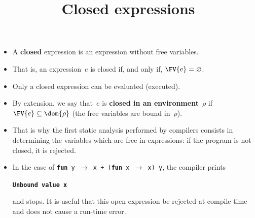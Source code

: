 \documentclass[wide]{slides}
\begin{document}
\begin{slide}
  \title{Closed expressions}

  \begin{itemize}

    \item A \textbf{closed} expression is an expression without free
      variables.

    \item That is, an expression~\(e\) is closed if, and only if,
      \(\FV{e} = \varnothing\).

    \item Only a closed expression can be evaluated (executed).

    \item By extension, we say that~\(e\) is \textbf{closed in an
      environment}~\(\rho\) if \(\FV{e} \subseteq \dom{\rho}\) (the
      free variables are bound in~\(\rho\)).

    \item That is why the first static analysis performed by compilers
      consists in determining the variables which are free in
      expressions: if the program is not closed, it is rejected.

    \item In the case of \texttt{\textbf{fun} y \(\rightarrow\) x +
      (\textbf{fun} x \(\rightarrow\) x) y}, the \OCaml compiler
      prints
      \begin{center}
        \texttt{\textbf{Unbound value x}}
      \end{center}
      and stops. It is useful that this open expression be rejected at
      compile\hyp{}time and does not cause a run\hyp{}time error.

  \end{itemize}

\end{slide}
\end{document}
